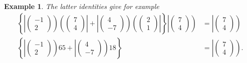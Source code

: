 \documentclass[aps,preprint]{revtex4}
\newtheorem{example}[theorem]{Example}
\begin{document}
\begin{example}
The latter identities give for example 
\begin{align}
\left\{ \left\vert \left( 
\begin{array}{c}
-1 \\ 
2%
\end{array}%
\right) \right) \left( \left( 
\begin{array}{c}
7 \\ 
4%
\end{array}%
\right) \right\vert +\left\vert \left( 
\begin{array}{c}
4 \\ 
-7%
\end{array}%
\right) \right) \left( \left( 
\begin{array}{c}
2 \\ 
1%
\end{array}%
\right) \right\vert \right\} \left\vert \left( 
\begin{array}{c}
7 \\ 
4%
\end{array}%
\right) \right) & =\left\vert \left( 
\begin{array}{c}
7 \\ 
4%
\end{array}%
\right) \right) \\
\left\{ \left\vert \left( 
\begin{array}{c}
-1 \\ 
2%
\end{array}%
\right) \right) 65+\left\vert \left( 
\begin{array}{c}
4 \\ 
-7%
\end{array}%
\right) \right) 18\right\} & =\left\vert \left( 
\begin{array}{c}
7 \\ 
4%
\end{array}%
\right) \right) .
\end{align}
\end{example}
\end{document}
